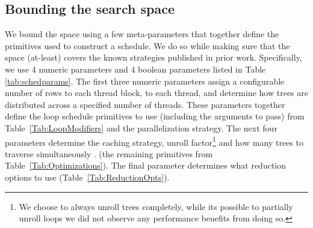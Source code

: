 \subsection{Bounding the search space}
We bound the space using a few meta-parameters that together define 
the primitives used to construct a schedule. We do so while making sure 
that the space (at-least) covers the known strategies published in prior work.
Specifically, we use 4 numeric parameters and 4 boolean parameters listed in Table \ref{tab:schedparams}. 
The first three numeric parameters assign a configurable number of rows to each 
thread block, to each thread, and determine how trees are distributed across a
specified number of threads. These parameters together define the loop schedule 
primitives to use (including the arguments to pass) from Table~\ref{Tab:LoopModifiers} 
and the parallelization strategy. The next four parameters determine the caching strategy, 
unroll factor{\footnote{We choose to always unroll trees completely, while its possible 
to partially unroll loops we did not observe any performance benefits from doing so.}} 
and how many trees to traverse simultaneously .  (the remaining primitives from Table~\ref{Tab:Optimizations}).  
The final parameter determines what reduction options to use (Table~\ref{Tab:ReductionOpts}).

